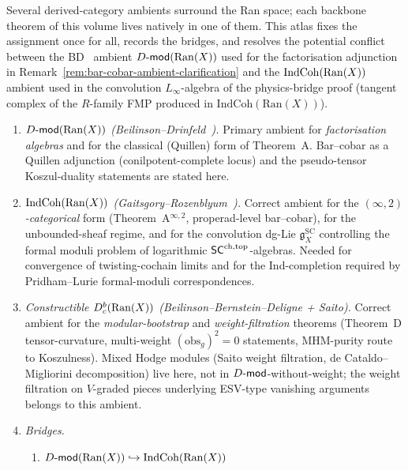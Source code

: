 \begin{remark}
\label{rem:factorisation-ambient-category-atlas}
%
%
%
%
%
Several derived-category ambients surround the Ran space; each
backbone theorem of this volume lives natively in one of them. This
atlas fixes the assignment once for all, records the bridges, and
resolves the potential conflict between the BD~\cite{BD04} ambient
$D\text{-}\mathsf{mod}(\mathrm{Ran}(X))$ used for the factorisation adjunction in
Remark~\ref{rem:bar-cobar-ambient-clarification} and the
$\operatorname{IndCoh}(\mathrm{Ran}(X))$ ambient used in the convolution $L_\infty$-algebra
of the physics-bridge proof (tangent complex of the $R$-family FMP
produced in $\mathrm{IndCoh}(\mathrm{Ran}(X))$).
\begin{enumerate}[label=\textup{(\Alph*)}]
\item \emph{$D\text{-}\mathsf{mod}(\mathrm{Ran}(X))$ (Beilinson--Drinfeld~\cite[\S 3.4]{BD04}).}
 Primary ambient for \emph{factorisation algebras} and for the
 classical (Quillen) form of Theorem~A. Bar--cobar as a Quillen
 adjunction (conilpotent-complete locus) and the pseudo-tensor
 Koszul-duality statements are stated here.
\item \emph{$\operatorname{IndCoh}(\mathrm{Ran}(X))$ (Gaitsgory--Rozenblyum~\cite[IV.5, V]{GR17}).}
 Correct ambient for the \emph{$(\infty,2)$-categorical} form
 (Theorem~A${}^{\infty,2}$, properad-level bar--cobar), for the
 unbounded-sheaf regime, and for the convolution dg-Lie
 $\mathfrak g^{\mathrm{SC}}_X$ controlling the formal moduli
 problem of logarithmic $\mathsf{SC}^{\mathrm{ch},\mathrm{top}}$-algebras. Needed for
 convergence of twisting-cochain limits and for the
 Ind-completion required by Pridham--Lurie formal-moduli
 correspondences.
\item \emph{Constructible $D^b_c(\mathrm{Ran}(X))$
 (Beilinson--Bernstein--Deligne + Saito).}
 Correct ambient for the \emph{modular-bootstrap} and
 \emph{weight-filtration} theorems (Theorem~D tensor-curvature,
 multi-weight $(\mathrm{obs}_g)^2 = 0$ statements, MHM-purity
 route to Koszulness). Mixed Hodge modules (Saito weight
 filtration, de Cataldo--Migliorini decomposition) live here,
 not in $D\text{-}\mathsf{mod}$-without-weight; the weight filtration on
 $V$-graded pieces underlying ESV-type vanishing arguments
 belongs to this ambient.
\item \emph{Bridges.}
 \begin{enumerate}[label=\textup{(B\arabic*)}]
 \item $D\text{-}\mathsf{mod}(\mathrm{Ran}(X)) \hookrightarrow \operatorname{IndCoh}(\mathrm{Ran}(X))$

\end{enumerate}
\end{enumerate}
\end{remark}
